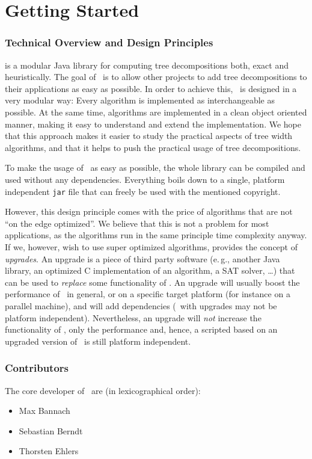 \documentclass[a4paper, ukenglish, twoside, openright]{jdrasilmanual}
\author{Max Bannach, Sebastian Berndt, Thorsten Ehlers}
\begin{document}
\part{Getting Started}
\section{Technical Overview and Design Principles}
\Jdrasil{} is a modular Java library for computing tree
decompositions both, exact and heuristically. The goal of \Jdrasil\ is
to allow other projects to add tree decompositions to their
applications as easy as possible. In order to achieve this, \Jdrasil\
is designed in a very modular way: Every algorithm is implemented as
interchangeable as possible. At the same time, algorithms are
implemented in a clean object oriented manner, making it easy to
understand and extend the implementation. We hope that this approach
makes it easier to study the practical aspects of tree width
algorithms, and that it helps to push the practical usage of tree
decompositions.

To make the usage of \Jdrasil\ as easy as possible, the whole library can be
compiled and used without any dependencies. Everything boils down to a
single, platform independent \texttt{jar} file that can freely be used
with the mentioned copyright.

However, this design principle comes with the price of algorithms that
are not ``on the edge optimized''. We believe that this is not a
problem for most applications, as the algorithms run in the same
principle time complexity anyway. If we, however, wish to use super
optimized algorithms, \Jdrasil{} provides the concept of
\emph{upgrades}. An upgrade is a piece of third party software
(e.\,g., another Java library, an optimized C implementation of an
algorithm, a SAT solver, \dots) that can be used to \emph{replace} some
functionality of \Jdrasil. An upgrade will usually boost the
performance of \Jdrasil\ in general, or on a specific target platform
(for instance on a parallel machine), and will add dependencies
(\Jdrasil\ with upgrades may not be platform
independent). Nevertheless, an upgrade will \emph{not} increase the
functionality of \Jdrasil, only the performance and, hence, a scripted
based on an upgraded version of \Jdrasil\ is still platform
independent.

\section{Contributors}
The core developer of \Jdrasil\ are (in lexicographical order):
\begin{itemize}
  \item Max Bannach
  \item Sebastian Berndt
  \item Thorsten Ehlers
\end{itemize}
\end{document}
